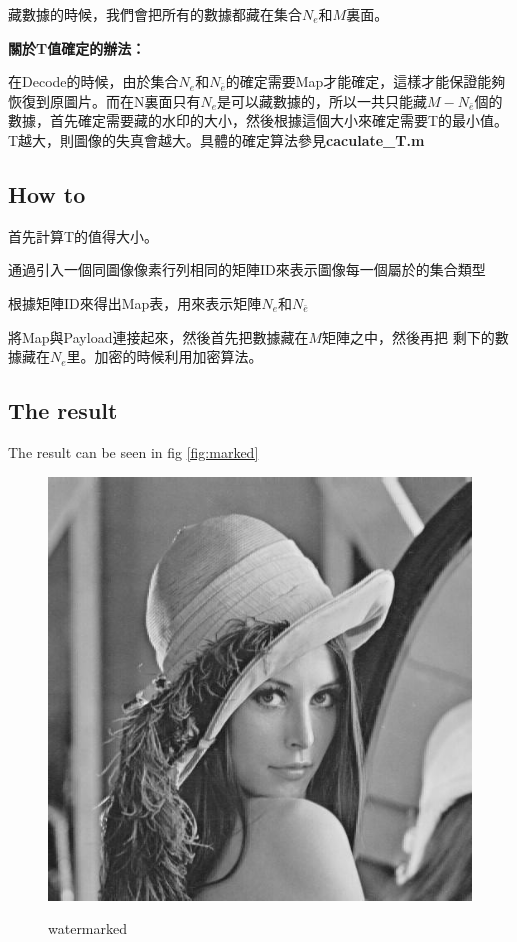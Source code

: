 \documentclass[a4paper,12pt]{article}%
\begin{document}
藏數據的時候，我們會把所有的數據都藏在集合$N_{e}$和$M$裏面。

\textbf{關於T值確定的辦法：}

    在Decode的時候，由於集合$N_e$和$N_{\bar{e}}$的確定需要Map才能確定，這樣才能保證能夠恢復到原圖片。而在N裏面只有$N_e$是可以藏數據的，所以一共只能藏$M - N_{\bar{e}}$個的數據，首先確定需要藏的水印的大小，然後根據這個大小來確定需要T的最小值。T越大，則圖像的失真會越大。具體的確定算法參見\textbf{caculate\_T.m}

\subsection{How to}

\begin{description}
\setlength{\itemsep}{0pt}
\setlength{\parskip}{0pt}
\setlength{\parsep}{0pt}
      \item[Step0]首先計算T的值得大小。
      \item[Step1]通過引入一個同圖像像素行列相同的矩陣ID來表示圖像每一個屬於的集合類型
      \item[Step2]根據矩陣ID來得出Map表，用來表示矩陣$N_e$和$N_{\bar{e}}$
      \item[Step3]將Map與Payload連接起來，然後首先把數據藏在$M$矩陣之中，然後再把
剩下的數據藏在$N_e$里。加密的時候利用加密算法。%
\end{description}

\subsection{The result}
    The result can be seen in fig \eqref{fig:marked}

\begin{figure}
  \centering
  \includegraphics[width=5in]{./figure/marked.jpg}\\
  \caption{watermarked}\label{fig:marked}
\end{figure}
\end{document}
